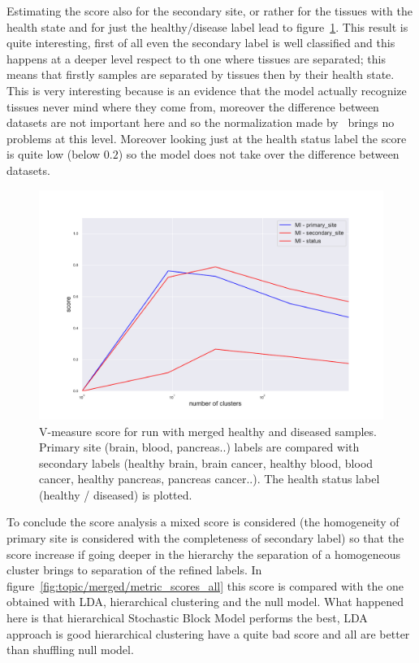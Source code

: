 Estimating the score also for the secondary site, or rather for the tissues with the health state and for just the healthy/disease label lead to figure~\ref{fig:topic/merged/metric_scores}. This result is quite interesting, first of all even the secondary label is well classified and this happens at a deeper level respect to th one where tissues are separated; this means that firstly samples are separated by tissues then by their health state. This is very interesting because is an evidence that the model actually recognize tissues never mind where they come from, moreover the difference between datasets are not important here and so the normalization made by~\cite{Betel2018} brings no problems at this level. Moreover looking just at the health status label the score is quite low (below $0.2$) so the model does not take over the difference between datasets.
\begin{figure}[htb!]
    \centering
    \includegraphics[width=0.8\linewidth]{pictures/topic/merged/metric_scores.pdf}
    \caption{V-measure score for run with merged healthy and diseased samples. Primary site (brain, blood, pancreas..) labels are compared with secondary labels (healthy brain, brain cancer, healthy blood, blood cancer, healthy pancreas, pancreas cancer..). The health status label (healthy / diseased) is plotted.}
    \label{fig:topic/merged/metric_scores}
\end{figure}
To conclude the score analysis a mixed score is considered (the homogeneity of primary site is considered with the completeness of secondary label) so that the score increase if going deeper in the hierarchy the separation of a homogeneous cluster brings to separation of the refined labels. In figure~\ref{fig:topic/merged/metric_scores_all} this score is compared with the one obtained with LDA, hierarchical clustering and the null model. What happened here is that hierarchical Stochastic Block Model performs the best, LDA approach is good hierarchical clustering have a quite bad score and all are better than shuffling null model.
